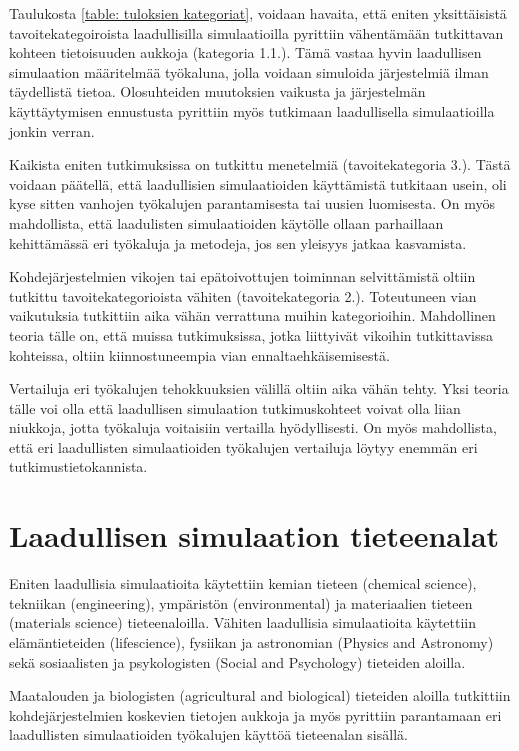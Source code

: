 \documentclass[utf8]{gradu3}
\begin{document}
Taulukosta \ref{table: tuloksien kategoriat}, voidaan havaita, 
että eniten yksittäisistä tavoitekategoiroista 
laadullisilla simulaatioilla pyrittiin vähentämään tutkittavan 
kohteen tietoisuuden aukkoja (kategoria 1.1.). 
Tämä vastaa hyvin laadullisen simulaation määritelmää
työkaluna, jolla voidaan simuloida järjestelmiä ilman täydellistä tietoa.
Olosuhteiden muutoksien vaikusta ja järjestelmän käyttäytymisen ennustusta
pyrittiin myös tutkimaan laadullisella simulaatioilla jonkin verran.

Kaikista eniten tutkimuksissa on tutkittu menetelmiä (tavoitekategoria 3.).
Tästä voidaan päätellä,  että laadullisien simulaatioiden käyttämistä 
tutkitaan usein, oli kyse sitten vanhojen työkalujen parantamisesta tai 
uusien luomisesta. 
On myös mahdollista, että laadulisten simulaatioiden käytölle ollaan 
parhaillaan kehittämässä eri työkaluja ja metodeja, jos sen yleisyys jatkaa 
kasvamista.

Kohdejärjestelmien vikojen tai epätoivottujen toiminnan selvittämistä 
oltiin tutkittu tavoitekategorioista vähiten (tavoitekategoria 2.).
Toteutuneen vian vaikutuksia tutkittiin aika vähän 
verrattuna muihin kategorioihin. 
Mahdollinen teoria tälle on, että muissa tutkimuksissa, 
jotka liittyivät vikoihin tutkittavissa kohteissa, 
oltiin kiinnostuneempia vian ennaltaehkäisemisestä.

Vertailuja eri työkalujen tehokkuuksien välillä oltiin aika vähän tehty. 
Yksi teoria tälle voi  olla että laadullisen simulaation tutkimuskohteet 
voivat olla liian niukkoja, jotta työkaluja voitaisiin vertailla hyödyllisesti.
On myös mahdollista, että eri laadullisten simulaatioiden työkalujen vertailuja 
löytyy enemmän eri tutkimustietokannista.

\section{Laadullisen simulaation tieteenalat}
Eniten laadullisia simulaatioita käytettiin kemian tieteen (chemical science),
tekniikan (engineering), ympäristön (environmental) ja materiaalien tieteen  (materials science) tieteenaloilla. 
Vähiten laadullisia simulaatioita käytettiin elämäntieteiden (lifescience),
fysiikan ja astronomian  (Physics and Astronomy) sekä 
sosiaalisten ja psykologisten (Social and Psychology) tieteiden aloilla.

Maatalouden ja biologisten (agricultural and biological) tieteiden aloilla
tutkittiin kohdejärjestelmien koskevien tietojen aukkoja ja myös pyrittiin
parantamaan eri laadullisten simulaatioiden työkalujen käyttöä tieteenalan
sisällä.
\end{document}
